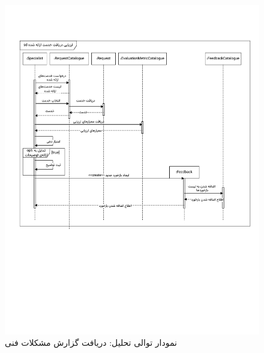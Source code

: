 \begin{figure}[ht!]
	\centering
	\includegraphics[scale=0.8, page=7]{figs/OOD-Sequence-3.pdf}
	\caption{نمودار توالی تحلیل: دریافت گزارش مشکلات فنی}
\end{figure}
\FloatBarrier
\newpage

